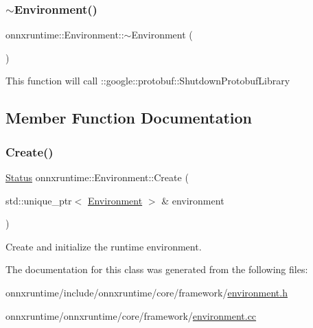 \subsubsection{\texorpdfstring{$\sim$\+Environment()}{~Environment()}}
{\footnotesize\ttfamily onnxruntime\+::\+Environment\+::$\sim$\+Environment (\begin{DoxyParamCaption}{ }\end{DoxyParamCaption})}

This function will call \+::google\+::protobuf\+::\+Shutdown\+Protobuf\+Library 

\subsection{Member Function Documentation}
\mbox{\label{classonnxruntime_1_1Environment_a27156c3c3c75745309a93a5fa9713942}} 
\subsubsection{\texorpdfstring{Create()}{Create()}}
{\footnotesize\ttfamily \mbox{\hyperlink{classonnxruntime_1_1common_1_1Status}{Status}} onnxruntime\+::\+Environment\+::\+Create (\begin{DoxyParamCaption}\item[{std\+::unique\+\_\+ptr$<$ \mbox{\hyperlink{classonnxruntime_1_1Environment}{Environment}} $>$ \&}]{environment }\end{DoxyParamCaption})\hspace{0.3cm}{\ttfamily [static]}}

Create and initialize the runtime environment. 

The documentation for this class was generated from the following files\+:\begin{DoxyCompactItemize}
\item 
onnxruntime/include/onnxruntime/core/framework/\mbox{\hyperlink{environment_8h}{environment.\+h}}\item 
onnxruntime/onnxruntime/core/framework/\mbox{\hyperlink{environment_8cc}{environment.\+cc}}\end{DoxyCompactItemize}
